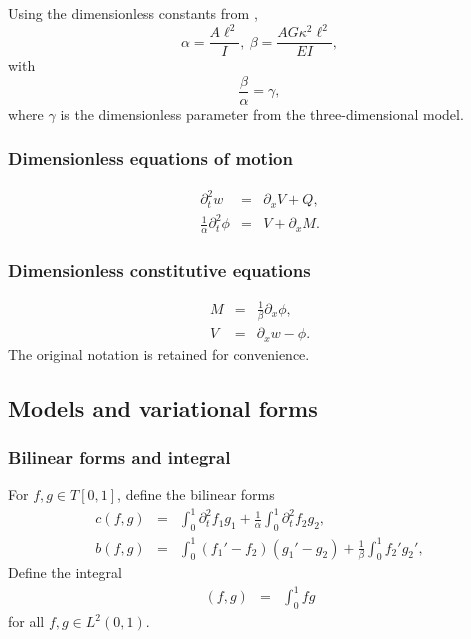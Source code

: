			Using the dimensionless constants from \cite{LVV09}, 
			\[\alpha = \frac{A \ell^2}{I},\ \beta =\frac{AG\kappa^2 \ell^2}{EI},\]
			with \[\frac{\beta}{\alpha} = \gamma,\] where $\gamma$ is the dimensionless parameter from the three-dimensional model.

		\subsubsection*{Dimensionless equations of motion}\label{sssec:1D_Model:DimensionlessEquationsOfMotion}
			\begin{eqnarray}
				\partial_{t}^{2} w &=& \partial_{x}V + Q, \label{eq:1D_Model:EquationOfMotion1D}\\
				\frac{1}{\alpha} \partial_{t}^{2} \phi &=& V + \partial_{x}M.\label{eq:1D_Model:EquationOfMotion2D}
			\end{eqnarray}
		\subsubsection*{Dimensionless constitutive equations}\label{sssec:1D_Model:DimensionlessConstitutiveEquations}
			\begin{eqnarray}
				M &=& \frac{1}{\beta}\partial_x \phi, \label{eq:1D_Model:ConstitutiveEquations1D}\\
				V &=& \partial_x w-\phi. \label{eq:1D_Model:ConstitutiveEquations2D}
			\end{eqnarray}
		The original notation is retained for convenience.

		\subsection{Models and variational forms}
			\subsubsection*{Bilinear forms and integral}
				For $f,g \in T[0,1]$, define the bilinear forms
				\begin{eqnarray}
					c(f,g) & = & \int_0^1  \partial_t^2 f_1 g_1 + \frac{1}{\alpha}\int_0^1  \partial_t^2 f_2g_2, \label{eq:1D_Model:Bilinear} \\
					b(f,g) & = &   \int_0^1 (f_1'-f_2)(g_1' - g_2) + \frac{1}{\beta}\int_0^1 f_2' g_2', \label{eq:1D_Model:Bilinear_c}
				\end{eqnarray}
				Define the integral
				\begin{eqnarray}
				(f,g)
					&=& \int_{0}^1 fg \label{eq:1D_Model:Bilinear_int}
				\end{eqnarray} for all $f,g \in L^2(0,1).$\\

